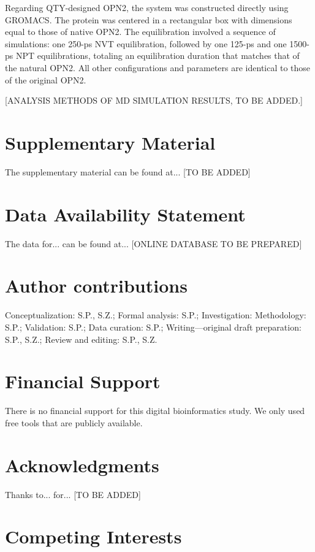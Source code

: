 \documentclass[fleqn,10pt]{manuscript}
\begin{document}
Regarding QTY-designed OPN2, the system was constructed directly using GROMACS. The protein was centered in a rectangular box with dimensions equal to those of native OPN2. The equilibration involved a sequence of simulations: one 250-ps NVT equilibration, followed by one 125-ps and one 1500-ps NPT equilibrations, totaling an equilibration duration that matches that of the natural OPN2. All other configurations and parameters are identical to those of the original OPN2.

[ANALYSIS METHODS OF MD SIMULATION RESULTS, TO BE ADDED.]

\section*{Supplementary Material}

The supplementary material can be found at... [TO BE ADDED]

\section*{Data Availability Statement} 

The data for... can be found at... [ONLINE DATABASE TO BE PREPARED]

\section*{Author contributions}

Conceptualization: S.P., S.Z.; Formal analysis: S.P.; Investigation: Methodology: S.P.; Validation: S.P.; Data curation: S.P.; Writing—original draft preparation: S.P., S.Z.; Review and editing: S.P., S.Z. 

\section*{Financial Support}

There is no financial support for this digital bioinformatics study. We only used free tools that are publicly available. 

\section*{Acknowledgments}

Thanks to... for... [TO BE ADDED]


\section*{Competing Interests}
\end{document}
